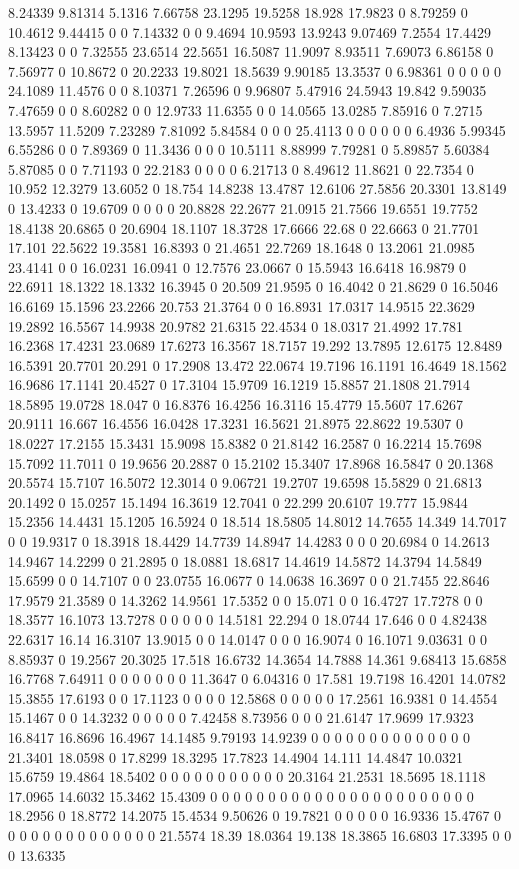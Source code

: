 8.24339 9.81314 5.1316 7.66758 23.1295 19.5258 18.928 17.9823 0 8.79259 0 10.4612 9.44415 0 0 7.14332 0 0 9.4694 10.9593 13.9243 9.07469 7.2554 17.4429 8.13423 0 0 7.32555 23.6514 22.5651 16.5087 11.9097 8.93511 7.69073 6.86158 0 7.56977 0 10.8672 0 20.2233 19.8021 18.5639 9.90185 13.3537 0 6.98361 0 0 0 0 0 24.1089 11.4576 0 0 8.10371 7.26596 0 9.96807 5.47916 24.5943 19.842 9.59035 7.47659 0 0 8.60282 0 0 12.9733 11.6355 0 0 14.0565 13.0285 7.85916 0 7.2715 13.5957 11.5209 7.23289 7.81092 5.84584 0 0 0 25.4113 0 0 0 0 0 0 6.4936 5.99345 6.55286 0 0 7.89369 0 11.3436 0 0 0 10.5111 8.88999 7.79281 0 5.89857 5.60384 5.87085 0 0 7.71193 0 22.2183 0 0 0 0 6.21713 0 8.49612 11.8621 0 22.7354 0 10.952 12.3279 13.6052 0 18.754 14.8238 13.4787 12.6106 27.5856 20.3301 13.8149 0 13.4233 0 19.6709 0 0 0 0 20.8828 22.2677 21.0915 21.7566 19.6551 19.7752 18.4138 20.6865 0 20.6904 18.1107 18.3728 17.6666 22.68 0 22.6663 0 21.7701 17.101 22.5622 19.3581 16.8393 0 21.4651 22.7269 18.1648 0 13.2061 21.0985 23.4141 0 0 16.0231 16.0941 0 12.7576 23.0667 0 15.5943 16.6418 16.9879 0 22.6911 18.1322 18.1332 16.3945 0 20.509 21.9595 0 16.4042 0 21.8629 0 16.5046 16.6169 15.1596 23.2266 20.753 21.3764 0 0 16.8931 17.0317 14.9515 22.3629 19.2892 16.5567 14.9938 20.9782 21.6315 22.4534 0 18.0317 21.4992 17.781 16.2368 17.4231 23.0689 17.6273 16.3567 18.7157 19.292 13.7895 12.6175 12.8489 16.5391 20.7701 20.291 0 17.2908 13.472 22.0674 19.7196 16.1191 16.4649 18.1562 16.9686 17.1141 20.4527 0 17.3104 15.9709 16.1219 15.8857 21.1808 21.7914 18.5895 19.0728 18.047 0 16.8376 16.4256 16.3116 15.4779 15.5607 17.6267 20.9111 16.667 16.4556 16.0428 17.3231 16.5621 21.8975 22.8622 19.5307 0 18.0227 17.2155 15.3431 15.9098 15.8382 0 21.8142 16.2587 0 16.2214 15.7698 15.7092 11.7011 0 19.9656 20.2887 0 15.2102 15.3407 17.8968 16.5847 0 20.1368 20.5574 15.7107 16.5072 12.3014 0 9.06721 19.2707 19.6598 15.5829 0 21.6813 20.1492 0 15.0257 15.1494 16.3619 12.7041 0 22.299 20.6107 19.777 15.9844 15.2356 14.4431 15.1205 16.5924 0 18.514 18.5805 14.8012 14.7655 14.349 14.7017 0 0 19.9317 0 18.3918 18.4429 14.7739 14.8947 14.4283 0 0 0 20.6984 0 14.2613 14.9467 14.2299 0 21.2895 0 18.0881 18.6817 14.4619 14.5872 14.3794 14.5849 15.6599 0 0 14.7107 0 0 23.0755 16.0677 0 14.0638 16.3697 0 0 21.7455 22.8646 17.9579 21.3589 0 14.3262 14.9561 17.5352 0 0 15.071 0 0 16.4727 17.7278 0 0 18.3577 16.1073 13.7278 0 0 0 0 0 14.5181 22.294 0 18.0744 17.646 0 0 4.82438 22.6317 16.14 16.3107 13.9015 0 0 14.0147 0 0 0 16.9074 0 16.1071 9.03631 0 0 8.85937 0 19.2567 20.3025 17.518 16.6732 14.3654 14.7888 14.361 9.68413 15.6858 16.7768 7.64911 0 0 0 0 0 0 0 11.3647 0 6.04316 0 17.581 19.7198 16.4201 14.0782 15.3855 17.6193 0 0 17.1123 0 0 0 0 12.5868 0 0 0 0 0 17.2561 16.9381 0 14.4554 15.1467 0 0 14.3232 0 0 0 0 0 7.42458 8.73956 0 0 0 21.6147 17.9699 17.9323 16.8417 16.8696 16.4967 14.1485 9.79193 14.9239 0 0 0 0 0 0 0 0 0 0 0 0 0 0 21.3401 18.0598 0 17.8299 18.3295 17.7823 14.4904 14.111 14.4847 10.0321 15.6759 19.4864 18.5402 0 0 0 0 0 0 0 0 0 0 0 20.3164 21.2531 18.5695 18.1118 17.0965 14.6032 15.3462 15.4309 0 0 0 0 0 0 0 0 0 0 0 0 0 0 0 0 0 0 0 0 0 0 0 18.2956 0 18.8772 14.2075 15.4534 9.50626 0 19.7821 0 0 0 0 0 16.9336 15.4767 0 0 0 0 0 0 0 0 0 0 0 0 0 0 21.5574 18.39 18.0364 19.138 18.3865 16.6803 17.3395 0 0 0 13.6335 